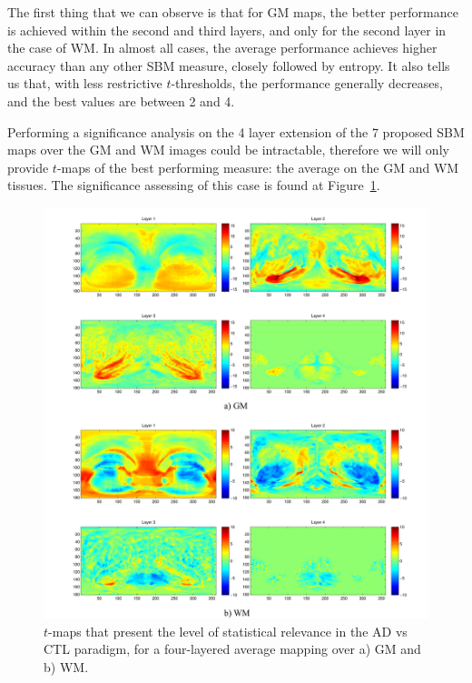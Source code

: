 The first thing that we can observe is that for \ac{GM} maps, the better performance is achieved within the second and third layers, and only for the second layer in the case of \ac{WM}. In almost all cases, the average performance achieves higher accuracy than any other \ac{SBM} measure, closely followed by entropy. It also tells us that, with less restrictive $t$-thresholds, the performance generally decreases, and the best values are between 2 and 4. 

Performing a significance analysis on the 4 layer extension of the 7 proposed \ac{SBM} maps over the \ac{GM} and \ac{WM} images could be intractable, therefore we will only provide $t$-maps of the best performing measure: the average on the \ac{GM} and \ac{WM} tissues. The significance assessing of this case is found at Figure~\ref{fig:tmaplayered}.

\begin{figure}[htp]
	\myfloatalign
	\includegraphics[width=\textwidth]{Graphics/ch6/08-Tmap4LayAverage}
	\caption[$t$-maps that present the level of statistical relevance in the \acs{AD} vs \acs{CTL} paradigm.]{$t$-maps that present the level of statistical relevance in the \acs{AD} vs \acs{CTL} paradigm, for a four-layered average mapping over a) \ac{GM} and b) \ac{WM}. }
	\label{fig:tmaplayered}
\end{figure} 

